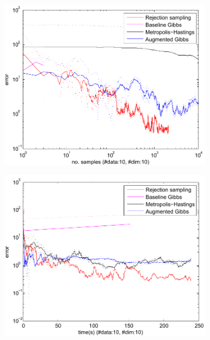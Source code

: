 \begin{figure}
\centering
\begin{subfigure}{.40\textwidth}
  \centering
  \includegraphics[width=1.00\textwidth]{pic/errVsamplesMMMdim10data10.pdf}
  \caption{}
  \label{fig:error-samples-bppl}
\end{subfigure}%
\begin{subfigure}{.40\textwidth}
  \centering
  \includegraphics[width=1.05\textwidth]{pic/errVtimeMMMdim10data10.pdf}
  \caption{}
  \label{fig:error-samples-bppl}
\end{subfigure}%
\\

\end{figure}
